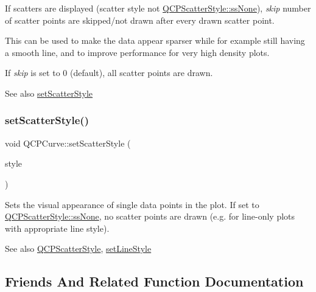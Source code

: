 If scatters are displayed (scatter style not \mbox{\hyperlink{class_q_c_p_scatter_style_adb31525af6b680e6f1b7472e43859349abd144c291ca274f77053ec68cab6c022}{Q\+C\+P\+Scatter\+Style\+::ss\+None}}), {\itshape skip} number of scatter points are skipped/not drawn after every drawn scatter point.

This can be used to make the data appear sparser while for example still having a smooth line, and to improve performance for very high density plots.

If {\itshape skip} is set to 0 (default), all scatter points are drawn.

\begin{DoxySeeAlso}{See also}
\mbox{\hyperlink{class_q_c_p_curve_a55e43b44709bf50a35500644988aa706}{set\+Scatter\+Style}} 
\end{DoxySeeAlso}
\mbox{\label{class_q_c_p_curve_a55e43b44709bf50a35500644988aa706}} 
\subsubsection{\texorpdfstring{setScatterStyle()}{setScatterStyle()}}
{\footnotesize\ttfamily void Q\+C\+P\+Curve\+::set\+Scatter\+Style (\begin{DoxyParamCaption}\item[{const \mbox{\hyperlink{class_q_c_p_scatter_style}{Q\+C\+P\+Scatter\+Style}} \&}]{style }\end{DoxyParamCaption})}

Sets the visual appearance of single data points in the plot. If set to \mbox{\hyperlink{class_q_c_p_scatter_style_adb31525af6b680e6f1b7472e43859349abd144c291ca274f77053ec68cab6c022}{Q\+C\+P\+Scatter\+Style\+::ss\+None}}, no scatter points are drawn (e.\+g. for line-\/only plots with appropriate line style).

\begin{DoxySeeAlso}{See also}
\mbox{\hyperlink{class_q_c_p_scatter_style}{Q\+C\+P\+Scatter\+Style}}, \mbox{\hyperlink{class_q_c_p_curve_a4a377ec863ff81a1875c3094a6177c19}{set\+Line\+Style}} 
\end{DoxySeeAlso}


\subsection{Friends And Related Function Documentation}
\mbox{\label{class_q_c_p_curve_a8429035e7adfbd7f05805a6530ad5e3b}} 
